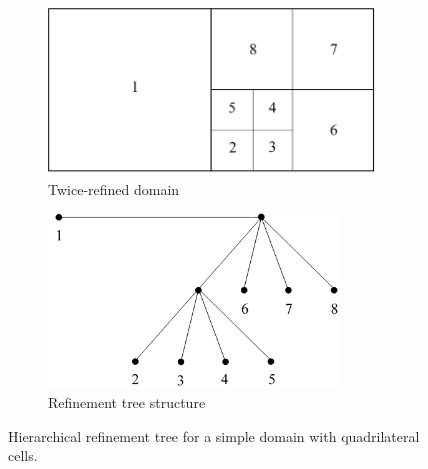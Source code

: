 \begin{figure}
\centering
{
	\begin{subfigure}[b]{0.48\textwidth}
		\centering
		\includegraphics[width=0.95\textwidth]{figures/sec_Sn/Quad_tree_domain.png}
		\caption{Twice-refined domain}
		\label{fig::Sn_Solution_Spatial_AMR_tree_dom}
	\end{subfigure}
}
	\hfill
{
	\begin{subfigure}[b]{0.48\textwidth}
		\centering
		\includegraphics[width=0.85\textwidth]{figures/sec_Sn/Quad_tree_structure.png}
		\caption{Refinement tree structure}
		\label{fig::Sn_Solution_Spatial_AMR_tree_struct}
	\end{subfigure}
}
\caption{Hierarchical refinement tree for a simple domain with quadrilateral cells.}
\label{fig::Sn_Solution_Spatial_AMR_tree}
\end{figure}

